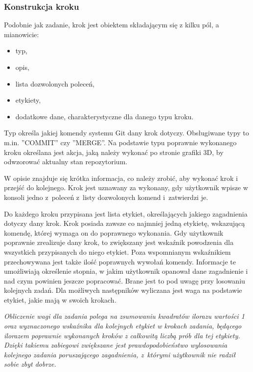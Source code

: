 \documentclass[11pt,a4paper,polish,thesis]{dcsbook}
\begin{document}
	
	\subsubsection{Konstrukcja kroku}
	
	Podobnie jak zadanie, krok jest obiektem składającym się z kilku pól, a mianowicie:
	\begin{itemize}
		\item typ,
		\item opis,
		\item lista dozwolonych poleceń,
		\item etykiety,
		\item dodatkowe dane, charakterystyczne dla danego typu kroku.	
	\end{itemize}

	Typ określa jakiej komendy systemu Git dany krok dotyczy. Obsługiwane typy to m.in. ''COMMIT'' czy ''MERGE''. Na podstawie typu poprawnie wykonanego kroku określana jest akcja, jaką należy wykonać po stronie grafiki 3D, by odwzorować aktualny stan repozytorium. 
	 
	W opisie znajduje się krótka informacja, co należy zrobić, aby wykonać krok i przejść do kolejnego. Krok jest uznawany za wykonany, gdy użytkownik wpisze w konsoli jedno z~poleceń z~listy dozwolonych komend i~zatwierdzi je.
	
	Do każdego kroku przypisana jest lista etykiet, określających jakiego zagadnienia dotyczy dany krok. Krok posiada zawsze co najmniej jedną etykietę, wskazującą komendę, której wymaga on do poprawnego wykonania. Gdy użytkownik poprawnie zrealizuje dany krok, to zwiększany jest wskaźnik powodzenia dla wszystkich przypisanych do niego etykiet. Poza wspomnianym wskaźnikiem przechowywana jest także ilość poprawnych wywołań komendy. Informacje te umożliwiają określenie stopnia, w jakim użytkownik opanował dane zagadnienie i nad czym powinien jeszcze popracować. Brane jest to pod uwagę przy losowaniu kolejnych zadań. Dla możliwych następników wyliczana jest waga na podstawie etykiet, jakie mają w swoich krokach. 
	
	\textit{Obliczenie wagi dla zadania polega na zsumowaniu kwadratów ilorazu wartości 1 oraz wyznaczonego wskaźnika dla kolejnych etykiet w krokach zadania, będącego ilorazem poprawnie wykonanych kroków z całkowitą liczbą prób dla tej etykiety. Dzięki takiemu zabiegowi zwiększane jest prawdopodobieństwo wylosowania kolejnego zadania poruszającego zagadnienia, z~którymi użytkownik nie radził sobie zbyt dobrze.}
	
\end{document}

